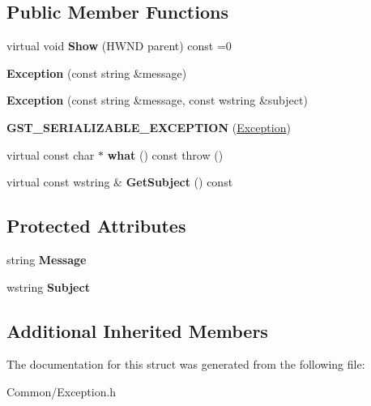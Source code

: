 \subsection*{Public Member Functions}
\begin{DoxyCompactItemize}
\item 
\mbox{\label{struct_gost_crypt_1_1_exception_a375647893713212053831bfab6b18443}} 
virtual void {\bfseries Show} (H\+W\+ND parent) const =0
\item 
\mbox{\label{struct_gost_crypt_1_1_exception_acd0d42a570b0d911850252899d60926c}} 
{\bfseries Exception} (const string \&message)
\item 
\mbox{\label{struct_gost_crypt_1_1_exception_a17e21ffb0a954147158b639787739ca9}} 
{\bfseries Exception} (const string \&message, const wstring \&subject)
\item 
\mbox{\label{struct_gost_crypt_1_1_exception_aa91f88e524902893d16cea9647ea79ba}} 
{\bfseries G\+S\+T\+\_\+\+S\+E\+R\+I\+A\+L\+I\+Z\+A\+B\+L\+E\+\_\+\+E\+X\+C\+E\+P\+T\+I\+ON} (\hyperlink{struct_gost_crypt_1_1_exception}{Exception})
\item 
\mbox{\label{struct_gost_crypt_1_1_exception_ad1017b825218b99e2f1aa899a7766904}} 
virtual const char $\ast$ {\bfseries what} () const  throw ()
\item 
\mbox{\label{struct_gost_crypt_1_1_exception_af98e7569294c848c7f71fdb8045516e6}} 
virtual const wstring \& {\bfseries Get\+Subject} () const
\end{DoxyCompactItemize}
\subsection*{Protected Attributes}
\begin{DoxyCompactItemize}
\item 
\mbox{\label{struct_gost_crypt_1_1_exception_a12571a4dac67123afa214de5fc088113}} 
string {\bfseries Message}
\item 
\mbox{\label{struct_gost_crypt_1_1_exception_a4729a8bb780a4b65c289d8c243473309}} 
wstring {\bfseries Subject}
\end{DoxyCompactItemize}
\subsection*{Additional Inherited Members}


The documentation for this struct was generated from the following file\+:\begin{DoxyCompactItemize}
\item 
Common/Exception.\+h\end{DoxyCompactItemize}
